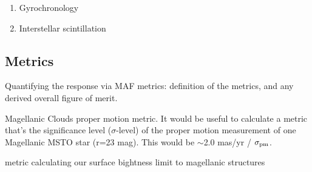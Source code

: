 \begin{enumerate}
\item Gyrochronology
  
\item Interstellar scintillation

  

\end{enumerate}


\subsection{Metrics}
\label{sec:keyword:metrics}

Quantifying the response via MAF metrics: definition of the metrics,
and any derived overall figure of merit.


\item  Magellanic Clouds proper motion metric.
It would be useful to calculate a metric that's the significance level ($\sigma$-level) of the proper motion measurement of one Magellanic MSTO star (r=23 mag).
This would be $\sim$2.0 mas/yr / $\sigma_{\rm pm}$.

\item metric calculating our surface bightness limit to magellanic structures

